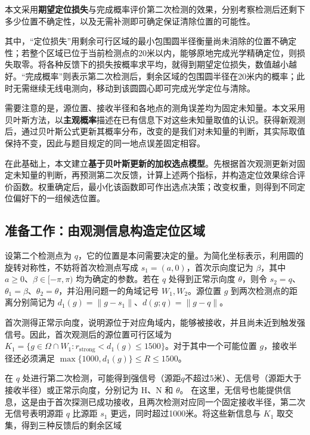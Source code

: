 \documentclass[UTF8,a4paper,zihao=-4,fontset=none]{ctexart}
\begin{document}
本文采用\textbf{期望定位损失}与{完成概率}评价第二次检测的效果，分别考察检测后还剩下多少位置不确定性，以及无需补测即可确定保证清除位置的可能性。

其中，“定位损失”用剩余可行区域的最小包围圆半径衡量尚未消除的位置不确定性；若整个区域已位于当前检测点的20米以内，能够原地完成光学精确定位，则损失取零。将各种反馈下的损失按概率求平均，就得到期望定位损失，数值越小越好。“完成概率”则表示第二次检测后，剩余区域的包围圆半径在20米内的概率；此时无需继续无线电测向，移动到该圆圆心即可完成光学定位与清除。

需要注意的是，源位置、接收半径和各地点的测角误差均为固定未知量。本文采用贝叶斯方法，以\textbf{主观概率}描述在已有信息下对这些未知量取值的认识。获得新观测后，通过贝叶斯公式更新其概率分布，改变的是我们对未知量的判断，其实际取值保持不变，因此与题目规定的同一地点误差固定相容。

在此基础上，本文建立\textbf{基于贝叶斯更新的加权选点模型}。先根据首次观测更新对固定未知量的判断，再预测第二次反馈，计算上述两个指标，并构造定位效果综合评价函数。权重确定后，最小化该函数即可作出选点决策；改变权重，则得到不同定位偏好下的一组候选位置。

\subsection{准备工作：由观测信息构造定位区域}

设第二个检测点为 \(q\)，它的位置是本问需要决定的量。为简化坐标表示，利用圆的旋转对称性，不妨将首次检测点写成 \(s_1=(a,0)\)，首次示向度记为 \(\beta\)，其中 \(a\ge0\)、\(\beta\in[-\pi,\pi)\) 均为确定的参数。若在 \(q\) 处得到正常示向度 \(\theta\)，则令 \(s_2=q\)、\(\theta_1=\beta\)、\(\theta_2=\theta\)，并沿用问题一的角域记号 \(W_1,W_2\)。源位置 \(g\) 到两次检测点的距离分别简记为 \(d_1(g)=\|g-s_1\|\)、\(d(g;q)=\|g-q\|\)。

首次测得正常示向度，说明源位于对应角域内，能够被接收，并且尚未近到触发强信号。因此，首次观测后的源位置可行区域为 \(K_1=\{g\in\Omega\cap W_1:r_{\mathrm{strong}}<d_1(g)\le1500\}\)。对于其中一个可能位置 \(g\)，接收半径还必须满足 \(\max\{1000,d_1(g)\}\le R\le1500\)。

在 \(q\) 处进行第二次检测，可能得到强信号（源距\(q\)不超过5米）、无信号（源距大于接收半径）或正常示向度，分别记为 \(\mathrm H\)、\(\mathrm N\) 和 \(\theta\)。
在这里，无信号也能提供信息，这是由于首次探测已成功接收，且两次检测对应同一个固定接收半径，第二次无信号表明源距 \(q\) 比源距 \(s_1\) 更远，同时超过1000米。将这些新信息与 \(K_1\) 取交集，得到三种反馈后的剩余区域
\end{document}
